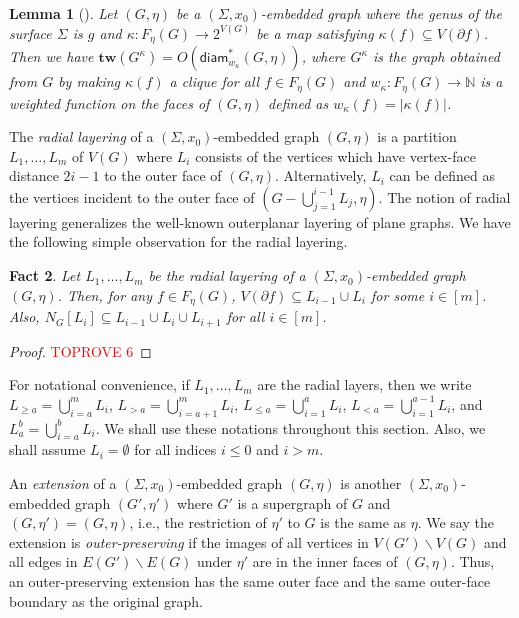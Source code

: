 \documentclass[a4paper,11pt]{article}
\newtheorem{lemma}{Lemma}
\numberwithin{lemma}{section}
\newtheorem{fact}[lemma]{Fact}
\newcommand{\tw}{\mathbf{tw}}
\begin{document}
\begin{lemma}[\cite{BandyapadhyayLLSJ22}]\label{lem-twdiam2}
Let $(G,\eta)$ be a $(\varSigma,x_0)$-embedded graph where the genus of the surface $\varSigma$ is $g$ and $\kappa: F_\eta(G) \rightarrow 2^{V(G)}$ be a map satisfying $\kappa(f) \subseteq V(\partial f)$.
Then we have $\tw(G^\kappa) = O(\mathsf{diam}_{w_\kappa}^*(G,\eta))$, where $G^\kappa$ is the graph obtained from $G$ by making $\kappa(f)$ a clique for all $f \in F_\eta(G)$ and $w_\kappa: F_\eta(G) \rightarrow \mathbb{N}$ is a weighted function on the faces of $(G,\eta)$ defined as $w_\kappa(f) = |\kappa(f)|$.
\end{lemma}

The \emph{radial layering} of a $(\varSigma,x_0)$-embedded graph $(G,\eta)$ is a partition $L_1,\dots,L_m$ of $V(G)$ where $L_i$ consists of the vertices which have vertex-face distance $2i-1$ to the outer face of $(G,\eta)$.
Alternatively, $L_i$ can be defined as the vertices incident to the outer face of $(G - \bigcup_{j=1}^{i-1} L_j, \eta)$.
The notion of radial layering generalizes the well-known outerplanar layering of plane graphs.
We have the following simple observation for the radial layering.

\begin{fact}\label{fact-diff1}
Let $L_1,\dots,L_m$ be the radial layering of a $(\varSigma,x_0)$-embedded graph $(G,\eta)$.
Then, for any $f \in F_\eta(G)$, $V(\partial f) \subseteq L_{i-1} \cup L_i$ for some $i \in [m]$.
Also, $N_G[L_i] \subseteq L_{i-1} \cup L_i \cup L_{i+1}$ for all $i \in [m]$.
\end{fact}

\begin{proof}\textcolor{red}{TOPROVE 6}\end{proof}

For notational convenience, if $L_1,\dots,L_m$ are the radial layers, then we write $L_{\geq a} = \bigcup_{i=a}^m L_i$, $L_{> a} = \bigcup_{i=a+1}^m L_i$, $L_{\leq a} = \bigcup_{i=1}^a L_i$, $L_{< a} = \bigcup_{i=1}^{a-1} L_i$, and $L_a^b = \bigcup_{i=a}^b L_i$.
We shall use these notations throughout this section.
Also, we shall assume $L_i = \emptyset$ for all indices $i \leq 0$ and $i >m$.

An \emph{extension} of a $(\varSigma,x_0)$-embedded graph $(G,\eta)$ is another $(\varSigma,x_0)$-embedded graph $(G',\eta')$ where $G'$ is a supergraph of $G$ and $(G,\eta') = (G,\eta)$, i.e., the restriction of $\eta'$ to $G$ is the same as $\eta$.
We say the extension is \emph{outer-preserving} if the images of all vertices in $V(G') \backslash V(G)$ and all edges in $E(G') \backslash E(G)$ under $\eta'$ are in the inner faces of $(G,\eta)$.
Thus, an outer-preserving extension has the same outer face and the same outer-face boundary as the original graph.
\end{document}
